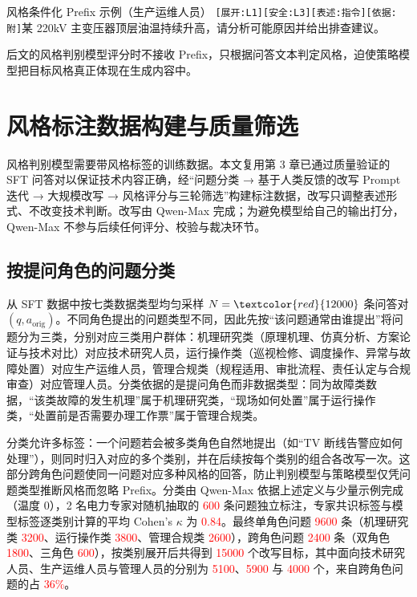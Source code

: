 \documentclass[fontset=fandol,type=master,campus=shenzhen,etitleauto=true]{hithesisbook}
\newcommand{\rev}[1]{\textcolor{red}{#1}}
\begin{document}
\begin{promptbox}{风格条件化 Prefix 示例（生产运维人员）}
\texttt{[展开:L1][安全:L3][表述:指令][依据:附]}\quad 某 220kV 主变压器顶层油温持续升高，请分析可能原因并给出排查建议。
\end{promptbox}

后文的风格判别模型评分时不接收 Prefix，只根据问答文本判定风格，迫使策略模型把目标风格真正体现在生成内容中。

\section{风格标注数据构建与质量筛选}\label{ux98ceux683cux504fux597dux6570ux636eux6784ux5efaux4e0e-llm-as-judge-ux7b5bux9009}

风格判别模型需要带风格标签的训练数据。本文复用第 3 章已通过质量验证的 SFT 问答对以保证技术内容正确，经“问题分类 → 基于人类反馈的改写 Prompt 迭代 → 大规模改写 → 风格评分与三轮筛选”构建标注数据，改写只调整表述形式、不改变技术判断。改写由 Qwen-Max 完成；为避免模型给自己的输出打分，Qwen-Max 不参与后续任何评分、校验与裁决环节。

\subsection{按提问角色的问题分类}\label{subsec:question-classify}

从 SFT 数据中按七类数据类型均匀采样 $N = \rev{12000}$ 条问答对 $(q, a_{\text{orig}})$。不同角色提出的问题类型不同，因此先按“该问题通常由谁提出”将问题分为三类，分别对应三类用户群体：机理研究类（原理机理、仿真分析、方案论证与技术对比）对应技术研究人员，运行操作类（巡视检修、调度操作、异常与故障处置）对应生产运维人员，管理合规类（规程适用、审批流程、责任认定与合规审查）对应管理人员。分类依据的是提问角色而非数据类型：同为故障类数据，“该类故障的发生机理”属于机理研究类，“现场如何处置”属于运行操作类，“处置前是否需要办理工作票”属于管理合规类。

分类允许多标签：一个问题若会被多类角色自然地提出（如“TV 断线告警应如何处理”），则同时归入对应的多个类别，并在后续按每个类别的组合各改写一次。这部分跨角色问题使同一问题对应多种风格的回答，防止判别模型与策略模型仅凭问题类型推断风格而忽略 Prefix。分类由 Qwen-Max 依据上述定义与少量示例完成（温度 0），2 名电力专家对随机抽取的 \rev{600} 条问题独立标注，专家共识标签与模型标签逐类别计算的平均 Cohen's $\kappa$ 为 \rev{0.84}。最终单角色问题 \rev{9600} 条（机理研究类 \rev{3200}、运行操作类 \rev{3800}、管理合规类 \rev{2600}），跨角色问题 \rev{2400} 条（双角色 \rev{1800}、三角色 \rev{600}），按类别展开后共得到 \rev{15000} 个改写目标，其中面向技术研究人员、生产运维人员与管理人员的分别为 \rev{5100}、\rev{5900} 与 \rev{4000} 个，来自跨角色问题的占 \rev{36\%}。
\end{document}

